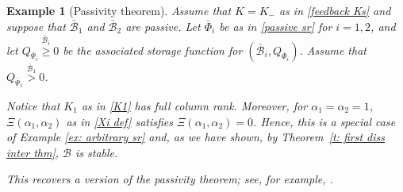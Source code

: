 \documentclass[letterpaper, 10 pt, conference]{ieeeconf}
\theoremstyle{ieeeconf}
\newtheorem{example}{Example}
\newcommand{\B}{\mathcal{B}}
\begin{document}
\begin{example}[Passivity theorem]
	Assume that $K=K_-$ as in \eqref{feedback Ks} and suppose that $\bar{\B}_1$ and $\bar{\B}_2$ are passive. Let $\bar{\Phi}_i$ be as in \eqref{passive sr}
	for $i=1,2$, and let $Q_{\bar{\Psi}_i}\stackrel{\bar{\B}_i}{\geq}0$ be the associated storage function for $(\bar{\B}_i,Q_{\bar{\Phi}_i})$. Assume that $Q_{\bar{\Psi}_1}\stackrel{\bar{\B}_1}{>}0$.
	
	Notice that $K_1$ as in \eqref{K1} has full column rank. Moreover, for $\alpha_1=\alpha_2=1$, $\Xi(\alpha_1,\alpha_2)$ as in \eqref{Xi def} satisfies ${\Xi(\alpha_1,\alpha_2)=0}$. 
	Hence, this is a special case of Example \ref{ex: arbitrary sr} and, as we have shown, by Theorem~\ref{t: first diss inter thm}, $\B$ is stable. 
	
	This recovers a version of the passivity theorem; see, for example, \cite{desoer_feedback_2009}.
	
\end{example}
\end{document}
